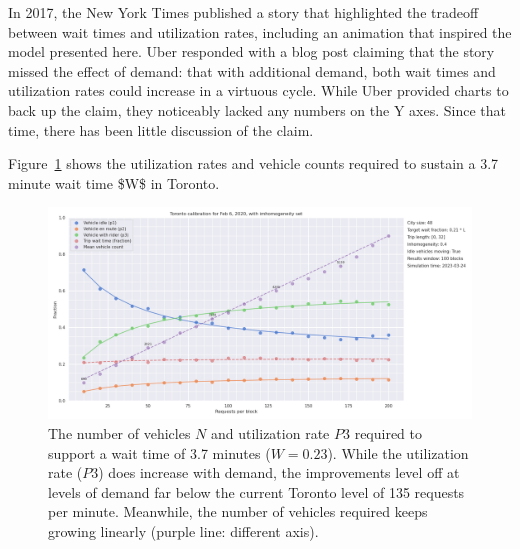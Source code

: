 \documentclass[
  letterpaper,
]{article}
\begin{document}
In 2017, the New York Times published a story that highlighted the
tradeoff between wait times and utilization rates, including an
animation that inspired the model presented here. Uber responded with a
blog post claiming that the story missed the effect of demand: that with
additional demand, both wait times and utilization rates could increase
in a virtuous cycle. While Uber provided charts to back up the claim,
they noticeably lacked any numbers on the Y axes. Since that time, there
has been little discussion of the claim.

Figure~\ref{fig-fixed-wait-time} shows the utilization rates and vehicle
counts required to sustain a 3.7 minute wait time \$W\$ in Toronto.

\begin{figure}

{\centering \includegraphics[width=1\textwidth,height=\textheight]{wait_times.png}

}

\caption{\label{fig-fixed-wait-time}The number of vehicles \(N\) and
utilization rate \(P3\) required to support a wait time of 3.7 minutes
(\(W =0.23\)). While the utilization rate (\(P3\)) does increase with
demand, the improvements level off at levels of demand far below the
current Toronto level of 135 requests per minute. Meanwhile, the number
of vehicles required keeps growing linearly (purple line: different
axis).}

\end{figure}
\end{document}
